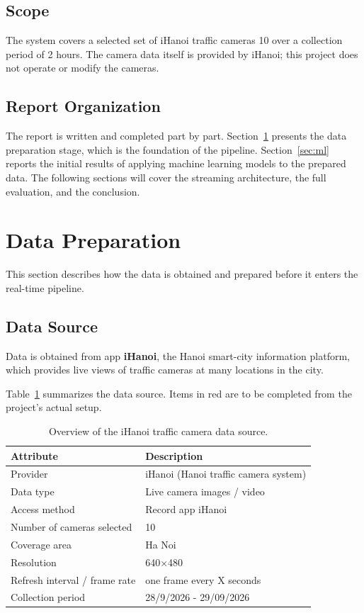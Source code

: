 \documentclass[12pt,a4paper]{article}
\begin{document}
\subsection{Scope}
The system covers a selected set of iHanoi traffic cameras
10 over a collection period of 2 hours. The camera data itself is provided by iHanoi; this project does
not operate or modify the cameras.

\subsection{Report Organization}
The report is written and completed part by part.
Section~\ref{sec:data} presents the data preparation stage, which is the
foundation of the pipeline. Section~\ref{sec:ml} reports the initial results
of applying machine learning models to the prepared data. The following
sections will cover the streaming architecture, the full evaluation, and the
conclusion.

\section{Data Preparation}
\label{sec:data}

This section describes how the data is obtained and prepared before it enters
the real-time pipeline.

\subsection{Data Source}
\label{subsec:source}
Data is obtained from app \textbf{iHanoi}, the Hanoi smart-city information
platform, which provides live views of traffic cameras at many locations in
the city.

Table~\ref{tab:source-overview} summarizes the data source. Items in red are to
be completed from the project's actual setup.

\begin{table}[H]
\centering
\caption{Overview of the iHanoi traffic camera data source.}
\label{tab:source-overview}
\begin{tabularx}{\textwidth}{@{}l X@{}}
\toprule
\textbf{Attribute} & \textbf{Description} \\
\midrule
Provider & iHanoi (Hanoi traffic camera system) \\
Data type & Live camera images / video \\
Access method & Record app iHanoi \\
Number of cameras selected & 10 \\
Coverage area & Ha Noi \\
Resolution & 640$\times$480 \\
Refresh interval / frame rate & one frame every X seconds \\
Collection period & 28/9/2026 - 29/09/2026 \\
\bottomrule
\end{tabularx}
\end{table}
\end{document}
